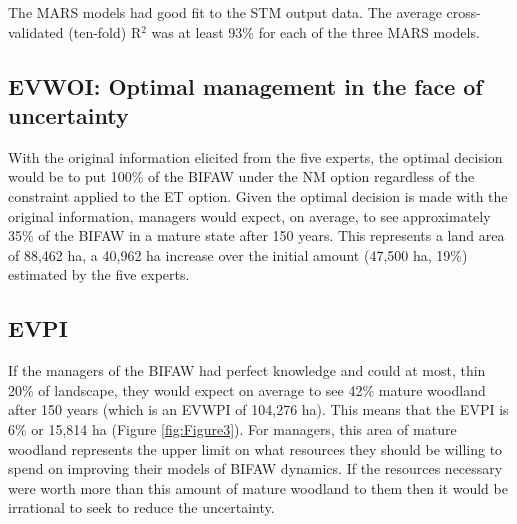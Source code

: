 \documentclass[draft]{article}
\theoremstyle{definition}
\theoremstyle{definition}
\theoremstyle{definition}
\theoremstyle{remark}
\begin{document}
The MARS models had good fit to the STM output data. The average
cross-validated (ten-fold) R\(^2\) was at least 93\% for each of the
three MARS models.

\subsection*{EVWOI: Optimal management in the face of
uncertainty}\label{evwoi-optimal-management-in-the-face-of-uncertainty}

With the original information elicited from the five experts, the
optimal decision would be to put 100\% of the BIFAW under the NM option
regardless of the constraint applied to the ET option. Given the optimal
decision is made with the original information, managers would expect,
on average, to see approximately 35\% of the BIFAW in a mature state
after 150 years. This represents a land area of 88,462 ha, a 40,962 ha
increase over the initial amount (47,500 ha, 19\%) estimated by the five
experts.

\subsection*{EVPI}\label{evpi-1}

If the managers of the BIFAW had perfect knowledge and could at most,
thin 20\% of landscape, they would expect on average to see 42\% mature
woodland after 150 years (which is an EVWPI of 104,276 ha). This means
that the EVPI is 6\% or 15,814 ha (Figure \ref{fig:Figure3}). For
managers, this area of mature woodland represents the upper limit on
what resources they should be willing to spend on improving their models
of BIFAW dynamics. If the resources necessary were worth more than this
amount of mature woodland to them then it would be irrational to seek to
reduce the uncertainty.
\end{document}
